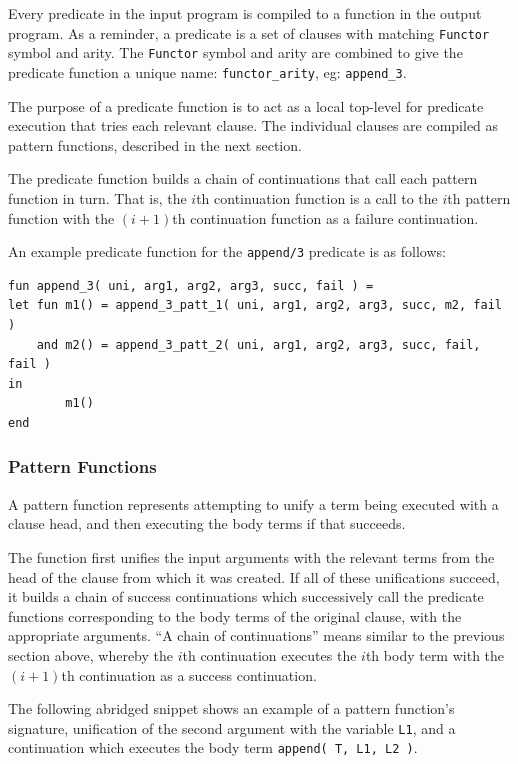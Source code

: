 \documentclass[12pt]{article}
\begin{document}
Every predicate in the input program is compiled to a function in the output program. 
As a reminder, a predicate is a set of clauses with matching \verb|Functor| symbol and arity. 
The \verb|Functor| symbol and arity are combined to give the predicate function a unique name: \verb|functor_arity|, eg: \verb|append_3|.

The purpose of a predicate function is to act as a local top-level for predicate execution that tries each relevant clause. The individual clauses are compiled as pattern functions, described in the next section. 

The predicate function builds a chain of continuations that call each pattern function in turn.
That is, the $i$th continuation function is a call to the $i$th pattern function with the $(i+1)$th continuation function as a failure continuation.

An example predicate function for the \verb|append/3| predicate is as follows:

\begin{verbatim}
fun append_3( uni, arg1, arg2, arg3, succ, fail ) = 
let fun m1() = append_3_patt_1( uni, arg1, arg2, arg3, succ, m2, fail )
    and m2() = append_3_patt_2( uni, arg1, arg2, arg3, succ, fail, fail ) 
in
        m1()
end
\end{verbatim}

\subsubsection{Pattern Functions}

A pattern function represents attempting to unify a term being executed with a clause head, and then executing the body terms if that succeeds.

The function first unifies the input arguments with the relevant terms from the head of the clause from which it was created.
If all of these unifications succeed, it builds a chain of success continuations which successively call the predicate functions corresponding to the body terms of the original clause, with the appropriate arguments.
``A chain of continuations'' means similar to the previous section above, whereby the $i$th continuation executes the $i$th body term with the $(i+1)$th continuation as a success continuation.

The following abridged snippet shows an example of a pattern function's signature, unification of the second argument with the variable \verb|L1|, and a continuation which executes the body term \verb|append( T, L1, L2 )|.
\end{document}
